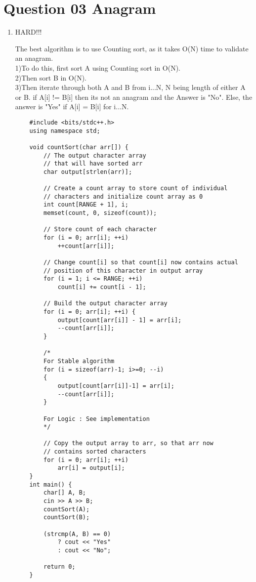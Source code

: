 \documentclass{article}
\begin{document}
\section{Question 03 Anagram}
\begin{enumerate}[label=(\arabic*)]

\item HARD!!!

The best algorithm is to use Counting sort, as it takes O(N) time to validate an anagram.
\\
1)To do this, first sort A using Counting sort in O(N).
\\
2)Then sort B in O(N).
\\
3)Then iterate through both A and B from i...N, N being length of either A or B. if A[i] != B[i] then its not an anagram and the Answer is "No". Else, the answer is "Yes" if A[i] = B[i] for i...N.
\\

\begin{verbatim}
    #include <bits/stdc++.h>
    using namespace std;
    
    void countSort(char arr[]) {
        // The output character array
        // that will have sorted arr
        char output[strlen(arr)];
      
        // Create a count array to store count of individual
        // characters and initialize count array as 0
        int count[RANGE + 1], i;
        memset(count, 0, sizeof(count));
      
        // Store count of each character
        for (i = 0; arr[i]; ++i)
            ++count[arr[i]];
      
        // Change count[i] so that count[i] now contains actual
        // position of this character in output array
        for (i = 1; i <= RANGE; ++i)
            count[i] += count[i - 1];
      
        // Build the output character array
        for (i = 0; arr[i]; ++i) {
            output[count[arr[i]] - 1] = arr[i];
            --count[arr[i]];
        }
      
        /* 
        For Stable algorithm 
        for (i = sizeof(arr)-1; i>=0; --i) 
        { 
            output[count[arr[i]]-1] = arr[i]; 
            --count[arr[i]]; 
        } 
          
        For Logic : See implementation 
        */
      
        // Copy the output array to arr, so that arr now
        // contains sorted characters
        for (i = 0; arr[i]; ++i)
            arr[i] = output[i];
    }
    int main() {
        char[] A, B;
        cin >> A >> B;
        countSort(A);
        countSort(B);
        
        (strcmp(A, B) == 0)
            ? cout << "Yes"
            : cout << "No";
        
        return 0;
    }
\end{verbatim}

\end{enumerate}
\end{document}
